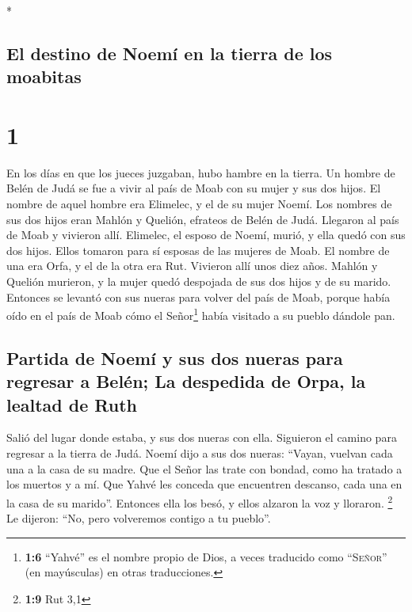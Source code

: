 \begin{paracol}{2} \switchcolumn[0]*

\hypertarget{el-destino-de-noemuxed-en-la-tierra-de-los-moabitas}{%
\subsection{El destino de Noemí en la tierra de los
moabitas}\label{el-destino-de-noemuxed-en-la-tierra-de-los-moabitas}}

\hypertarget{section}{%
\section{1}\label{section}}

 En los días en que los jueces juzgaban, hubo hambre en la
tierra. Un hombre de Belén de Judá se fue a vivir al país de Moab con su
mujer y sus dos hijos.  El nombre de aquel hombre era
Elimelec, y el de su mujer Noemí. Los nombres de sus dos hijos eran
Mahlón y Quelión, efrateos de Belén de Judá. Llegaron al país de Moab y
vivieron allí.  Elimelec, el esposo de Noemí, murió, y
ella quedó con sus dos hijos.  Ellos tomaron para sí
esposas de las mujeres de Moab. El nombre de una era Orfa, y el de la
otra era Rut. Vivieron allí unos diez años.  Mahlón y
Quelión murieron, y la mujer quedó despojada de sus dos hijos y de su
marido.  Entonces se levantó con sus nueras para volver
del país de Moab, porque había oído en el país de Moab cómo el
Señor\footnote{\textbf{1:6} ``Yahvé'' es el nombre propio de Dios, a
  veces traducido como ``\textsc{Señor}'' (en mayúsculas) en otras
  traducciones.} había visitado a su pueblo dándole pan.

\hypertarget{partida-de-noemuxed-y-sus-dos-nueras-para-regresar-a-beluxe9n-la-despedida-de-orpa-la-lealtad-de-ruth}{%
\subsection{Partida de Noemí y sus dos nueras para regresar a Belén; La
despedida de Orpa, la lealtad de
Ruth}\label{partida-de-noemuxed-y-sus-dos-nueras-para-regresar-a-beluxe9n-la-despedida-de-orpa-la-lealtad-de-ruth}}

 Salió del lugar donde estaba, y sus dos nueras con ella.
Siguieron el camino para regresar a la tierra de Judá. 
Noemí dijo a sus dos nueras: ``Vayan, vuelvan cada una a la casa de su
madre. Que el Señor las trate con bondad, como ha tratado a los muertos
y a mí.  Que Yahvé les conceda que encuentren descanso,
cada una en la casa de su marido''. Entonces ella los besó, y ellos
alzaron la voz y lloraron. \footnote{\textbf{1:9} Rut 3,1}
 Le dijeron: ``No, pero volveremos contigo a tu pueblo''.


\end{paracol}
